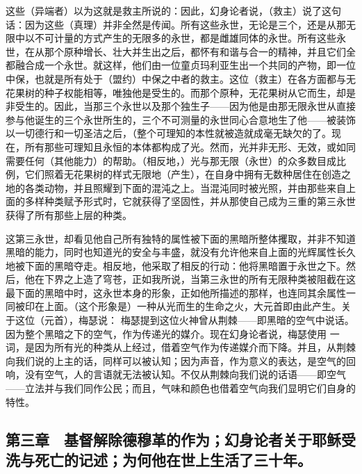 这些（异端者）以为这就是救主所说的：因此，幻身论者说，（救主）说了这句话：因为这些（真理）并非全然是传闻。所有这些永世，无论是三个，还是从那无限中以不可计量的方式产生的无限多的永世，都是雌雄同体的永世。所有这些永世，在从那个原种增长、壮大并生出之后，都怀有和谐与合一的精神，并且它们全都融合成一个永世。就这样，他们由一位童贞玛利亚生出一个共同的产物，即一位中保，也就是所有处于（盟约）中保之中者的救主。这位（救主）在各方面都与无花果树的种子权能相等，唯独他是受生的。而那个原种，无花果树从它而生，却是非受生的。因此，当那三个永世以及那个独生子——因为他是由那无限永世从直接参与他诞生的三个永世所生的，三个不可测量的永世同心合意地生了他——被装饰以一切德行和一切圣洁之后，（整个可理知的本性就被造就成毫无缺欠的了。现在，所有那些可理知且永恒的本体都构成了光。然而，光并非无形、无效，或如同需要任何（其他能力）的帮助。（相反地，）光与那无限（永世）的众多数目成比例，它们照着无花果树的样式无限地（产生），在自身中拥有无数种居住在创造之地的各类动物，并且照耀到下面的混沌之上。当混沌同时被光照，并由那些来自上面的多样种类赋予形式时，它就获得了坚固性，并从那使自己成为三重的第三永世获得了所有那些上层的种类。\par

这第三永世，却看见他自己所有独特的属性被下面的黑暗所整体攫取，并非不知道黑暗的能力，同时也知道光的安全与丰盛，就没有允许他来自上面的光辉属性长久地被下面的黑暗夺走。相反地，他采取了相反的行动：他将黑暗置于永世之下。然后，他在下界之上造了穹苍，正如我所说，当第三永世的所有无限种类被阻截在这最下面的黑暗中时，这永世本身的形象，正如他所描述的那样，也连同其余属性一同被印在上面。（这个形象是）一种从光而生的生命之火，大元首即由此产生。关于这位（元首），梅瑟说： 梅瑟提到这位火神曾从荆棘——即黑暗的空气中说话。因为整个黑暗之下的空气，作为传递光的媒介。现在幻身论者说，梅瑟使用  一词，是因为所有光的种类从上经过，借着空气作为传递媒介而下降。并且，从荆棘向我们说的上主的话，同样可以被认知；因为声音，作为意义的表达，是空气的回响，没有空气，人的言语就无法被认知。不仅从荆棘向我们说的话语——即空气——立法并与我们同作公民；而且，气味和颜色也借着空气向我们显明它们自身的特性。\par


\subsection{第三章　基督解除德穆革的作为；幻身论者关于耶稣受洗与死亡的记述；为何他在世上生活了三十年。}

